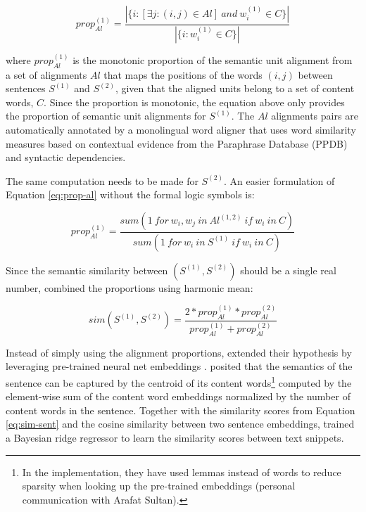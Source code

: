 \vspace{-2mm}

\begin{equation}\label{eq:prop-al}
{ prop }_{ Al }^{ (1) }=\frac { |\{ i:[\exists j:(i,j)\in Al] \ and \ { w }_{ i }^{ (1) }\in C\} | }{ |\{ i:{ w }_{ i }^{ (1) }\in C\} | } 
\end{equation}

where ${ prop }_{ Al }^{ (1) }$ is the monotonic proportion of the semantic unit alignment from a set of alignments $Al$ that maps the positions of the words $(i,j)$ between sentences $S^{(1)}$ and $S^{(2)}$, given that the aligned units belong to a set of content words, $C$. Since the proportion is monotonic, the equation above only provides the proportion of semantic unit alignments for $S^{(1)}$. The $Al$ alignments pairs are automatically annotated by a monolingual word aligner \citep{sultan2014back} that uses word similarity measures based on contextual evidence from the Paraphrase Database (PPDB) \citep{ppdb} and syntactic dependencies.

The same computation needs to be made for $S^{(2)}$. An easier formulation of Equation \eqref{eq:prop-al} without the formal logic symbols is:

\vspace{-5mm}

\begin{equation}\label{eq:prop-al-pythonic}
{ prop }_{ Al }^{ (1) }=\frac { sum(1 \ for \ { w }_{ i },{ w }_{ j } \ in \ { Al }^{ (1,2) } \ if \ { w }_{ i } \ in \ C) }{ sum(1 \ for \ { w }_{ i } \ in \ { S }^{ (1) } \ if \ { w }_{ i } \ in \ C) } 
\end{equation}

\vspace{2mm}

Since the semantic similarity between  $(S^{(1)}, S^{(2)})$ should be a single real number, \cite{sultan2014dls} combined the proportions using harmonic mean:

\vspace{-5mm}

\begin{equation}\label{eq:sim-sent}
sim({ S }_{  }^{ (1) },{ S }_{  }^{ (2) })=\frac { 2*{ prop }_{ Al }^{ (1) }*{ prop }_{ Al }^{ (2) } }{ { prop }_{ Al }^{ (1) }+{ prop }_{ Al }^{ (2) } } 
\end{equation}

Instead of simply using the alignment proportions, \cite{sultan2015dls} extended their hypothesis by leveraging pre-trained neural net embeddings \citep{baroni2014composes}. \cite{sultan2015dls}  posited that the semantics of the sentence can be captured by the centroid of its content words\footnote{In the implementation, they have used lemmas instead of words to reduce sparsity when looking up the pre-trained embeddings (personal communication with Arafat Sultan).} computed by the element-wise sum of the content word embeddings normalized by the number of content words in the sentence. Together with the similarity scores from Equation \eqref{eq:sim-sent} and the cosine similarity between two sentence embeddings, \cite{sultan2015dls} trained a Bayesian ridge regressor to learn the similarity scores between text snippets. 

